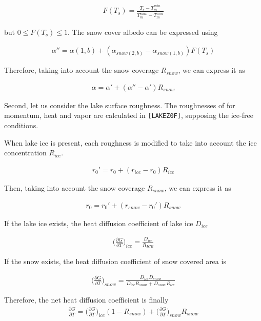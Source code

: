 \begin{eqnarray}
    F(T_s) = \frac{T_s-T_m^{min}}{T_m^{max}-T_m^{min}}
\end{eqnarray}

but \(0 \le F(T_s)\le 1\). The snow cover albedo can be expressed using

\begin{eqnarray}
    {\alpha''} = \alpha(1,b) + (\alpha_{snow(2,b)}-\alpha_{snow(1,b)})F(T_s)
\end{eqnarray}

Therefore, taking into account the snow coverage \(R_{snow}\), we can
express it as

\begin{eqnarray}
    \alpha = {\alpha'} +(\alpha''-\alpha')R_{snow}
\end{eqnarray}

Second, let us consider the lake surface roughness. The roughnesses of
for momentum, heat and vapor are calculated in \texttt{{[}LAKEZ0F{]}},
supposing the ice-free conditions.

When lake ice is present, each roughness is modified to take into
account the ice concentration \(R_{ice}\).

\begin{eqnarray}
    {r_0'} = r_0 + (r_{ice} -r_0) R_{ice}
\end{eqnarray}

Then, taking into account the snow coverage \(R_{snow}\), we can express
it as

\begin{eqnarray}
    {r_0} = {r_0'} + (r_{snow} - {r_0'}) R_{snow}
\end{eqnarray}

If the lake ice exists, the heat diffusion coefficient of lake ice
\(D_{ice}\)

\begin{eqnarray}
    \Big(\frac{\partial G}{\partial T}\Big)_{ice} = \frac{D_{ice}}{R_{ICE}}
\end{eqnarray}

If the snow exists, the heat diffusion coefficient of snow covered area
is

\begin{eqnarray}
    \Big(\frac{\partial G}{\partial T}\Big)_{snow}  =  \frac{D_{ice}D_{snow}}{D_{ice}R_{snow}+D_{snow}R_{ice}}
\end{eqnarray}

Therefore, the net heat diffusion coefficient is finally \begin{eqnarray}
    \frac{\partial G}{\partial T} = \Big(\frac{\partial G}{\partial T} \Big)_{ice} (1-R_{snow}) + \Big(\frac{\partial G}{\partial T}\Big)_{snow} R_{snow}
\end{eqnarray}

